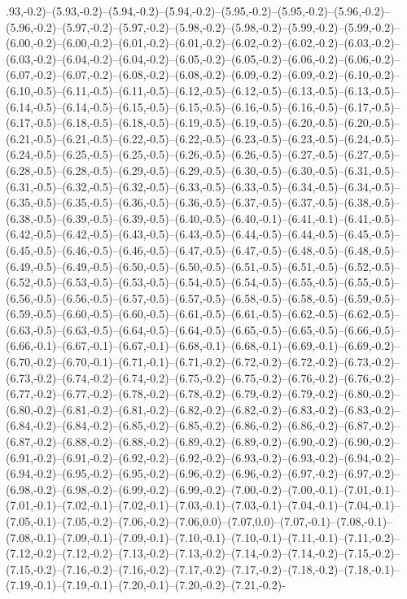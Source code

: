 .93,-0.2)--(5.93,-0.2)--(5.94,-0.2)--(5.94,-0.2)--(5.95,-0.2)--(5.95,-0.2)--(5.96,-0.2)--(5.96,-0.2)--(5.97,-0.2)--(5.97,-0.2)--(5.98,-0.2)--(5.98,-0.2)--(5.99,-0.2)--(5.99,-0.2)--(6.00,-0.2)--(6.00,-0.2)--(6.01,-0.2)--(6.01,-0.2)--(6.02,-0.2)--(6.02,-0.2)--(6.03,-0.2)--(6.03,-0.2)--(6.04,-0.2)--(6.04,-0.2)--(6.05,-0.2)--(6.05,-0.2)--(6.06,-0.2)--(6.06,-0.2)--(6.07,-0.2)--(6.07,-0.2)--(6.08,-0.2)--(6.08,-0.2)--(6.09,-0.2)--(6.09,-0.2)--(6.10,-0.2)--(6.10,-0.5)--(6.11,-0.5)--(6.11,-0.5)--(6.12,-0.5)--(6.12,-0.5)--(6.13,-0.5)--(6.13,-0.5)--(6.14,-0.5)--(6.14,-0.5)--(6.15,-0.5)--(6.15,-0.5)--(6.16,-0.5)--(6.16,-0.5)--(6.17,-0.5)--(6.17,-0.5)--(6.18,-0.5)--(6.18,-0.5)--(6.19,-0.5)--(6.19,-0.5)--(6.20,-0.5)--(6.20,-0.5)--(6.21,-0.5)--(6.21,-0.5)--(6.22,-0.5)--(6.22,-0.5)--(6.23,-0.5)--(6.23,-0.5)--(6.24,-0.5)--(6.24,-0.5)--(6.25,-0.5)--(6.25,-0.5)--(6.26,-0.5)--(6.26,-0.5)--(6.27,-0.5)--(6.27,-0.5)--(6.28,-0.5)--(6.28,-0.5)--(6.29,-0.5)--(6.29,-0.5)--(6.30,-0.5)--(6.30,-0.5)--(6.31,-0.5)--(6.31,-0.5)--(6.32,-0.5)--(6.32,-0.5)--(6.33,-0.5)--(6.33,-0.5)--(6.34,-0.5)--(6.34,-0.5)--(6.35,-0.5)--(6.35,-0.5)--(6.36,-0.5)--(6.36,-0.5)--(6.37,-0.5)--(6.37,-0.5)--(6.38,-0.5)--(6.38,-0.5)--(6.39,-0.5)--(6.39,-0.5)--(6.40,-0.5)--(6.40,-0.1)--(6.41,-0.1)--(6.41,-0.5)--(6.42,-0.5)--(6.42,-0.5)--(6.43,-0.5)--(6.43,-0.5)--(6.44,-0.5)--(6.44,-0.5)--(6.45,-0.5)--(6.45,-0.5)--(6.46,-0.5)--(6.46,-0.5)--(6.47,-0.5)--(6.47,-0.5)--(6.48,-0.5)--(6.48,-0.5)--(6.49,-0.5)--(6.49,-0.5)--(6.50,-0.5)--(6.50,-0.5)--(6.51,-0.5)--(6.51,-0.5)--(6.52,-0.5)--(6.52,-0.5)--(6.53,-0.5)--(6.53,-0.5)--(6.54,-0.5)--(6.54,-0.5)--(6.55,-0.5)--(6.55,-0.5)--(6.56,-0.5)--(6.56,-0.5)--(6.57,-0.5)--(6.57,-0.5)--(6.58,-0.5)--(6.58,-0.5)--(6.59,-0.5)--(6.59,-0.5)--(6.60,-0.5)--(6.60,-0.5)--(6.61,-0.5)--(6.61,-0.5)--(6.62,-0.5)--(6.62,-0.5)--(6.63,-0.5)--(6.63,-0.5)--(6.64,-0.5)--(6.64,-0.5)--(6.65,-0.5)--(6.65,-0.5)--(6.66,-0.5)--(6.66,-0.1)--(6.67,-0.1)--(6.67,-0.1)--(6.68,-0.1)--(6.68,-0.1)--(6.69,-0.1)--(6.69,-0.2)--(6.70,-0.2)--(6.70,-0.1)--(6.71,-0.1)--(6.71,-0.2)--(6.72,-0.2)--(6.72,-0.2)--(6.73,-0.2)--(6.73,-0.2)--(6.74,-0.2)--(6.74,-0.2)--(6.75,-0.2)--(6.75,-0.2)--(6.76,-0.2)--(6.76,-0.2)--(6.77,-0.2)--(6.77,-0.2)--(6.78,-0.2)--(6.78,-0.2)--(6.79,-0.2)--(6.79,-0.2)--(6.80,-0.2)--(6.80,-0.2)--(6.81,-0.2)--(6.81,-0.2)--(6.82,-0.2)--(6.82,-0.2)--(6.83,-0.2)--(6.83,-0.2)--(6.84,-0.2)--(6.84,-0.2)--(6.85,-0.2)--(6.85,-0.2)--(6.86,-0.2)--(6.86,-0.2)--(6.87,-0.2)--(6.87,-0.2)--(6.88,-0.2)--(6.88,-0.2)--(6.89,-0.2)--(6.89,-0.2)--(6.90,-0.2)--(6.90,-0.2)--(6.91,-0.2)--(6.91,-0.2)--(6.92,-0.2)--(6.92,-0.2)--(6.93,-0.2)--(6.93,-0.2)--(6.94,-0.2)--(6.94,-0.2)--(6.95,-0.2)--(6.95,-0.2)--(6.96,-0.2)--(6.96,-0.2)--(6.97,-0.2)--(6.97,-0.2)--(6.98,-0.2)--(6.98,-0.2)--(6.99,-0.2)--(6.99,-0.2)--(7.00,-0.2)--(7.00,-0.1)--(7.01,-0.1)--(7.01,-0.1)--(7.02,-0.1)--(7.02,-0.1)--(7.03,-0.1)--(7.03,-0.1)--(7.04,-0.1)--(7.04,-0.1)--(7.05,-0.1)--(7.05,-0.2)--(7.06,-0.2)--(7.06,0.0)--(7.07,0.0)--(7.07,-0.1)--(7.08,-0.1)--(7.08,-0.1)--(7.09,-0.1)--(7.09,-0.1)--(7.10,-0.1)--(7.10,-0.1)--(7.11,-0.1)--(7.11,-0.2)--(7.12,-0.2)--(7.12,-0.2)--(7.13,-0.2)--(7.13,-0.2)--(7.14,-0.2)--(7.14,-0.2)--(7.15,-0.2)--(7.15,-0.2)--(7.16,-0.2)--(7.16,-0.2)--(7.17,-0.2)--(7.17,-0.2)--(7.18,-0.2)--(7.18,-0.1)--(7.19,-0.1)--(7.19,-0.1)--(7.20,-0.1)--(7.20,-0.2)--(7.21,-0.2)-